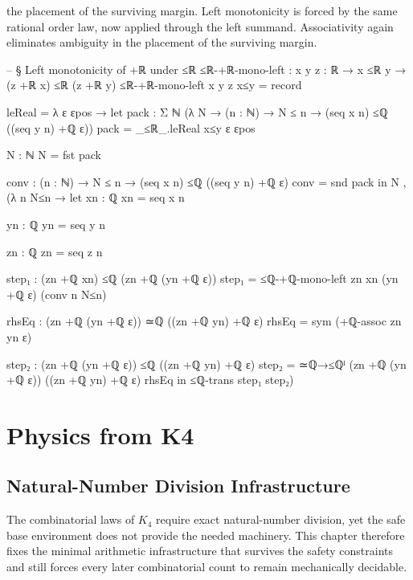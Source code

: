 \documentclass[11pt,a4paper]{book}
\def\texorpdfstring#1#2{#2}%
\begin{document}
the placement of the surviving margin.
Left monotonicity is forced by the same rational order law, now applied through the left summand. Associativity again eliminates ambiguity in the placement of the surviving margin.

\begin{code}
-- § Left monotonicity of +ℝ under ≤ℝ
≤ℝ-+ℝ-mono-left : {x y z : ℝ} → x ≤ℝ y → (z +ℝ x) ≤ℝ (z +ℝ y)
≤ℝ-+ℝ-mono-left {x} {y} {z} x≤y = record
  { leReal = λ ε εpos →
      let
        pack : Σ ℕ (λ N → (n : ℕ) → N ≤ n → (seq x n) ≤ℚ ((seq y n) +ℚ ε))
        pack = _≤ℝ_.leReal x≤y ε εpos

        N : ℕ
        N = fst pack

        conv : (n : ℕ) → N ≤ n → (seq x n) ≤ℚ ((seq y n) +ℚ ε)
        conv = snd pack
      in
      N , (λ n N≤n →
        let
          xn : ℚ
          xn = seq x n

          yn : ℚ
          yn = seq y n

          zn : ℚ
          zn = seq z n

          step₁ : (zn +ℚ xn) ≤ℚ (zn +ℚ (yn +ℚ ε))
          step₁ = ≤ℚ-+ℚ-mono-left zn xn (yn +ℚ ε) (conv n N≤n)

          rhsEq : (zn +ℚ (yn +ℚ ε)) ≃ℚ ((zn +ℚ yn) +ℚ ε)
          rhsEq = sym (+ℚ-assoc zn yn ε)

          step₂ : (zn +ℚ (yn +ℚ ε)) ≤ℚ ((zn +ℚ yn) +ℚ ε)
          step₂ = ≃ℚ→≤ℚˡ {(zn +ℚ (yn +ℚ ε))} {((zn +ℚ yn) +ℚ ε)} rhsEq
        in
        ≤ℚ-trans step₁ step₂)
  }
\end{code}


\part{Physics from \texorpdfstring{$K_4$}{K4}}


\chapter{Natural-Number Division Infrastructure}

The combinatorial laws of $K_4$ require exact natural-number division, yet the safe base environment does not provide the needed machinery. This chapter therefore fixes the minimal arithmetic infrastructure that survives the safety constraints and still forces every later combinatorial count to remain mechanically decidable.
\end{document}
